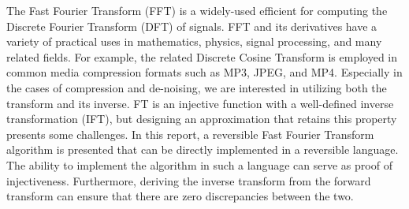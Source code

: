 The Fast Fourier Transform (FFT) is a widely-used efficient for computing the
Discrete Fourier Transform (DFT) of signals.
FFT and its derivatives have a variety of practical uses in
mathematics, physics, signal processing, and many related fields.
For example,
the related Discrete Cosine Transform is employed in common media compression formats such as
MP3, JPEG, and MP4.
Especially in the cases of compression and de-noising,
we are interested in utilizing both the transform and its inverse.
FT is an injective function with a well-defined inverse transformation (IFT),
but designing an approximation that retains this property presents some challenges.
%
In this report,
a reversible Fast Fourier Transform algorithm is presented
that can be directly implemented in a reversible language.
The ability to implement the algorithm in such a language can serve as proof of injectiveness.
Furthermore, deriving the inverse transform from the forward transform can ensure
that there are zero discrepancies between the two.
